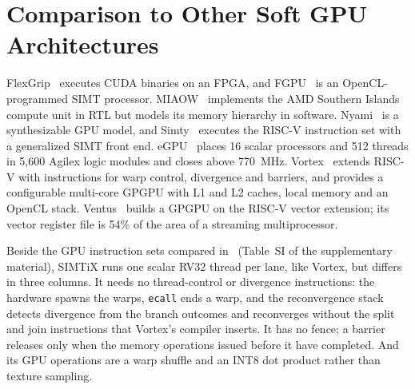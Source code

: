 \documentclass[journal]{IEEEtran}
\begin{document}
\section{Comparison to Other Soft GPU Architectures}\label{sec:related}
FlexGrip~\cite{flexgrip} executes CUDA binaries on an FPGA, and
FGPU~\cite{fgpu} is an OpenCL-programmed SIMT processor. MIAOW~\cite{miaow}
implements the AMD Southern Islands compute unit in RTL but models its memory
hierarchy in software. Nyami~\cite{nyuzi} is a synthesizable GPU model, and
Simty~\cite{simty} executes the RISC-V instruction set with a generalized SIMT
front end. eGPU~\cite{egpu} places 16 scalar processors and 512 threads in 5,600
Agilex logic modules and closes above 770~MHz. Vortex~\cite{vortex} extends
RISC-V with instructions for warp control, divergence and barriers, and provides
a configurable multi-core GPGPU with L1 and L2 caches, local memory and an OpenCL
stack. Ventus~\cite{ventus25} builds a GPGPU on the RISC-V vector extension; its
vector register file is 54\% of the area of a streaming multiprocessor.

Beside the GPU instruction sets compared in~\cite{vortex} (Table~SI of the
supplementary material), SIMTiX runs one scalar RV32 thread per lane, like
Vortex, but differs in three columns. It needs no thread-control or divergence
instructions: the hardware spawns the warps, \texttt{ecall} ends a warp, and the
reconvergence stack detects divergence from the branch outcomes and reconverges
without the split and join instructions that Vortex's compiler inserts. It has no
fence; a barrier releases only when the memory operations issued before it have
completed. And its GPU operations are a warp shuffle and an INT8 dot product
rather than texture sampling.
\end{document}
